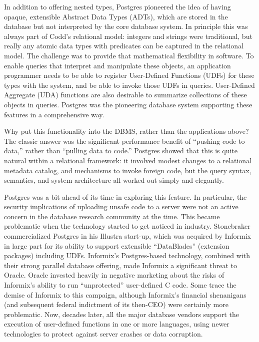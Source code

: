 \documentclass[sigconf,natbib=false]{acmart}
\begin{document}
In addition to offering nested types, Postgres pioneered the idea of having opaque, extensible Abstract Data Types (ADTs), which are stored in the database but not interpreted by the core database system. In principle this was always part of Codd's relational model: integers and strings were traditional, but really any atomic data types with predicates can be captured in the relational model. The challenge was to provide that mathematical flexibility in software. To enable queries that interpret and manipulate these objects, an application programmer needs to be able to register User-Defined Functions (UDFs) for these types with the system, and be able to invoke those UDFs in queries. User-Defined Aggregate (UDA) functions are also desirable to summarize collections of these objects in queries. Postgres was the pioneering database system supporting these features in a comprehensive way. 



Why put this functionality into the DBMS, rather than the applications above? The classic answer was the significant performance benefit of ``pushing code to data,'' rather than ``pulling data to code.'' Postgres showed that this is quite natural within a relational framework: it involved modest changes to a relational metadata catalog, and mechanisms to invoke foreign code, but the query syntax, semantics, and system architecture all worked out simply and elegantly. 



Postgres was a bit ahead of its time in exploring this feature. In particular, the security implications of uploading unsafe code to a server were not an active concern in the database research community at the time. This became problematic when the technology started to get noticed in industry. Stonebraker commercialized Postgres in his Illustra start-up, which was acquired by Informix in large part for its ability to support extensible ``DataBlades'' (extension packages) including UDFs. Informix's Postgres-based technology, combined with their strong parallel database offering, made Informix a significant threat to Oracle. Oracle invested heavily in negative marketing about the risks of Informix's ability to run ``unprotected'' user-defined C code. Some trace the demise of Informix to this campaign, although Informix's financial shenanigans (and subsequent federal indictment of its then-CEO) were certainly more problematic. Now, decades later, all the major database vendors support the execution of user-defined functions in one or more languages, using newer technologies to protect against server crashes or data corruption. 
\end{document}
